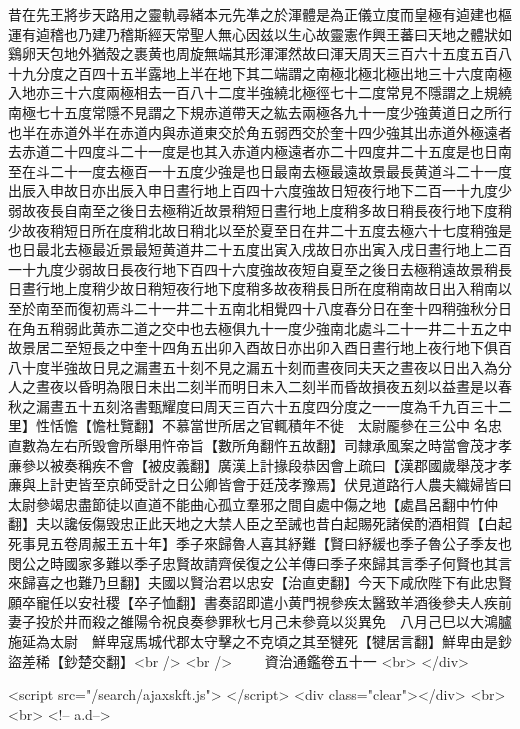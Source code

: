 昔在先王將步天路用之靈軌尋緒本元先凖之於渾體是為正儀立度而皇極有逌建也樞運有逌稽也乃建乃稽斯經天常聖人無心因兹以生心故靈憲作興王蕃曰天地之體狀如鷄卵天包地外猶殻之裹黄也周旋無端其形渾渾然故曰渾天周天三百六十五度五百八十九分度之百四十五半露地上半在地下其二端謂之南極北極北極出地三十六度南極入地亦三十六度兩極相去一百八十二度半強繞北極徑七十二度常見不隱謂之上規繞南極七十五度常隱不見謂之下規赤道帶天之紘去兩極各九十一度少強黄道日之所行也半在赤道外半在赤道内與赤道東交於角五弱西交於奎十四少強其出赤道外極遠者去赤道二十四度斗二十一度是也其入赤道内極遠者亦二十四度井二十五度是也日南至在斗二十一度去極百一十五度少強是也日最南去極最遠故景最長黄道斗二十一度出辰入申故日亦出辰入申日晝行地上百四十六度強故日短夜行地下二百一十九度少弱故夜長自南至之後日去極稍近故景稍短日晝行地上度稍多故日稍長夜行地下度稍少故夜稍短日所在度稍北故日稍北以至於夏至日在井二十五度去極六十七度稍強是也日最北去極最近景最短黄道井二十五度出寅入戌故日亦出寅入戌日晝行地上二百一十九度少弱故日長夜行地下百四十六度強故夜短自夏至之後日去極稍遠故景稍長日晝行地上度稍少故日稍短夜行地下度稍多故夜稍長日所在度稍南故日出入稍南以至於南至而復初焉斗二十一井二十五南北相覺四十八度春分日在奎十四稍強秋分日在角五稍弱此黄赤二道之交中也去極俱九十一度少強南北處斗二十一井二十五之中故景居二至短長之中奎十四角五出卯入酉故日亦出卯入酉日晝行地上夜行地下俱百八十度半強故日見之漏晝五十刻不見之漏五十刻而晝夜同夫天之晝夜以日出入為分人之晝夜以昏明為限日未出二刻半而明日未入二刻半而昏故損夜五刻以益晝是以春秋之漏晝五十五刻洛書甄耀度曰周天三百六十五度四分度之一一度為千九百三十二里】性恬憺【憺杜覽翻】不慕當世所居之官輒積年不徙　太尉龎參在三公中名忠直數為左右所毁會所舉用忤帝旨【數所角翻忤五故翻】司隸承風案之時當會茂才孝亷參以被奏稱疾不會【被皮義翻】廣漢上計掾段恭因會上疏曰【漢郡國歲舉茂才孝亷與上計吏皆至京師受計之日公卿皆會于廷茂孝豫焉】伏見道路行人農夫織婦皆曰太尉參竭忠盡節徒以直道不能曲心孤立羣邪之間自處中傷之地【處昌呂翻中竹仲翻】夫以讒佞傷毁忠正此天地之大禁人臣之至誡也昔白起賜死諸侯酌酒相賀【白起死事見五卷周赧王五十年】季子來歸魯人喜其紓難【賢曰紓緩也季子魯公子季友也閔公之時國家多難以季子忠賢故請齊侯復之公羊傳曰季子來歸其言季子何賢也其言來歸喜之也難乃旦翻】夫國以賢治君以忠安【治直吏翻】今天下咸欣陛下有此忠賢願卒寵任以安社稷【卒子恤翻】書奏詔即遣小黄門視參疾太醫致羊酒後參夫人疾前妻子投於井而殺之雒陽令祝良奏參罪秋七月己未參竟以災異免　八月己巳以大鴻臚施延為太尉　鮮卑寇馬城代郡太守擊之不克頃之其至犍死【犍居言翻】鮮卑由是鈔盜差稀【鈔楚交翻】<br />
<br />
　　資治通鑑卷五十一  <br>
   </div> 

<script src="/search/ajaxskft.js"> </script>
 <div class="clear"></div>
<br>
<br>
 <!-- a.d-->

